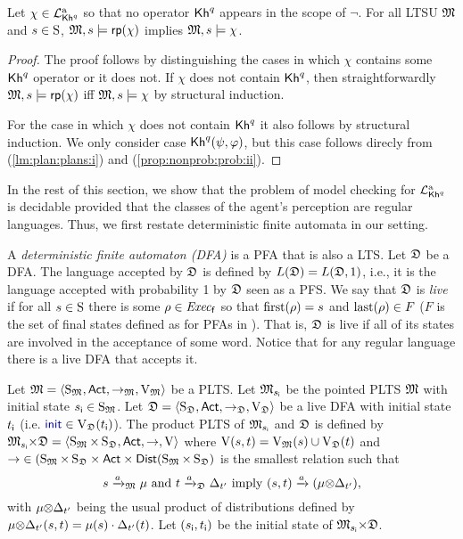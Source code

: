 \begin{proposition}\label{prop:Khunc:PKhadapt}
  Let $\chi\in\PKhadapt$ so that no operator $\kh^q$ appears in the
  scope of $\neg$.  For all LTSU $\model$
  and $s\in\S$, $\model,s\models\fgetprob(\chi)$ implies
  $\model,s\models\chi$.
\end{proposition}
%
\begin{proof}
  The proof follows by distinguishing the cases in which $\chi$
  contains some $\kh^q$ operator or it does not.
  If $\chi$ does not contain $\kh^q$, then straightforwardly
  $\model,s\models\fgetprob(\chi)$ iff $\model,s\models\chi$ by
  structural induction.

  For the case in which $\chi$ does not contain $\kh^q$ it also
  follows by structural induction.  We only consider case
  $\kh^q(\psi,\varphi)$, but this case follows direcly from
   (\cref{lm:plan:plans:i}) and
   (\cref{prop:nonprob:prob:ii}).
\end{proof}

In the rest of this section, we show that the problem of model
checking for $\PKhadapt$ is decidable provided that the classes of the
agent's perception are regular languages.  Thus, we first restate
deterministic finite automata in our setting.

A \emph{deterministic finite automaton (DFA)} is a PFA that is also a
LTS. Let $\dfa$ be a DFA.  The language accepted by $\dfa$ is defined
by $L(\dfa)=L(\dfa,1)$, i.e., it is the language accepted with
probability 1 by $\dfa$ seen as a PFS.
%
We say that $\dfa$ is \emph{live} if for all $s\in\S$ there is some
$\rho\in\execf$ so that $\first(\rho)=s$ and $\last(\rho)\in F$ ($F$
is the set of final states defined as for PFAs in
).  That is, $\dfa$ is live if all of its
states are involved in the acceptance of some word.  Notice that for
any regular language there is a live DFA that accepts it.

Let $\model=\tup{\S_\model,\Act,\ra_\model,\V_\model}$ be a PLTS.  Let
$\model_{\sini}$ be the pointed PLTS $\model$ with initial state
$\sini\in\S_\model$.
%
Let $\dfa=\tup{\S_\dfa,\Act,\ra_\dfa,\V_\dfa}$ be a live DFA with
initial state $\tini$ (i.e. $\init\in\V_\dfa(\tini)$).  The product
PLTS of $\model_{\sini}$ and $\dfa$ is defined by
$\model_{\sini}{\times}\dfa=\tup{\S_\model{\times}\S_\dfa,\Act,\ra,\V}$
where $\V(s,t)=\V_\model(s)\cup\V_\dfa(t)$ and
${\ra}\in{(\S_\model{\times}\S_\dfa}\times\Act\times\Dist({\S_\model{\times}\S_\dfa})$
is the smallest relation such that
%
\[s\reach{a}_\model\mu \text{ and } t\reach{a}_\dfa\Dirac_{t'} \text{ imply } (s,t)\reach{a}(\mu{\otimes}\Dirac_{t'}),\]
%
with $\mu{\otimes}\Dirac_{t'}$ being the usual product of distributions
defined by $\mu{\otimes}\Dirac_{t'}(s,t)= \mu(s)\cdot\Dirac_{t'}(t)$.
Let $(\sini,\tini)$ be the initial state of
$\model_{\sini}{\times}\dfa$.




